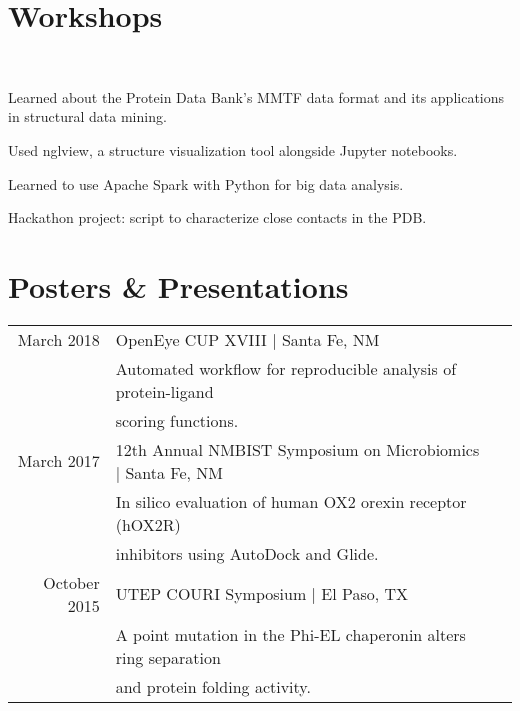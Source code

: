 \documentclass[]{deedy-resume-openfont}
\begin{document}
\begin{minipage}[t]{0.66\textwidth}
\section{Workshops}
\\
\begin{tightemize}
\item Learned about the Protein Data Bank's MMTF data format and its applications in structural data mining.
\item Used nglview, a structure visualization tool alongside Jupyter notebooks.
\item Learned to use Apache Spark with Python for big data analysis. \item Hackathon project:  script to characterize close contacts in the PDB. \end{tightemize}
\sectionsep


\section{Posters \& Presentations} 
\begin{tabular}{rll}
March 2018      & OpenEye CUP XVIII | Santa Fe, NM \\
                & Automated workflow for reproducible analysis of protein-ligand \\
                & scoring functions.\\
March 2017      & 12th Annual NMBIST Symposium on Microbiomics | Santa Fe, NM \\
                & In silico evaluation of human OX2 orexin receptor (hOX2R) \\
                & inhibitors using AutoDock and Glide. \\
October 2015    & UTEP COURI Symposium | El Paso, TX \\
                & A point mutation in the Phi-EL chaperonin alters ring separation \\
                & and protein folding activity. \\
\end{tabular}
\sectionsep

\end{minipage} 
\end{document}
